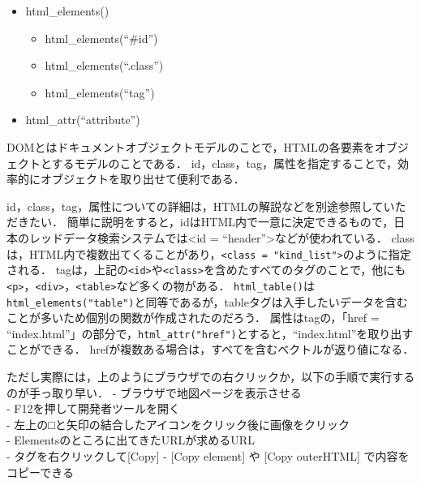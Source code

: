 \documentclass[
]{article}
\providecommand{\tightlist}{%
  \setlength{\itemsep}{0pt}\setlength{\parskip}{0pt}}
\begin{document}
\begin{itemize}
\tightlist
\item
  html\_elements()

  \begin{itemize}
  \tightlist
  \item
    html\_elements(``\#id'')\\
  \item
    html\_elements(``.class'')\\
  \item
    html\_elements(``tag'')\\
  \end{itemize}
\item
  html\_attr(``attribute'')
\end{itemize}

DOMとはドキュメントオブジェクトモデルのことで，HTMLの各要素をオブジェクトとするモデルのことである．
id，class，tag，属性を指定することで，効率的にオブジェクトを取り出せて便利である．

id，class，tag，属性についての詳細は，HTMLの解説などを別途参照していただきたい．
簡単に説明をすると，idはHTML内で一意に決定できるもので，日本のレッドデータ検索システムでは\textless id = ``header''\textgreater などが使われている．
classは，HTML内で複数出てくることがあり，\texttt{\textless{}class\ =\ "kind\_list"\textgreater{}}のように指定される．
tagは，上記の\texttt{\textless{}id\textgreater{}}や\texttt{\textless{}class\textgreater{}}を含めたすべてのタグのことで，他にも\texttt{\textless{}p\textgreater{}}，\texttt{\textless{}div\textgreater{}}，\texttt{\textless{}table\textgreater{}}など多くの物がある．
\texttt{html\_table()}は\texttt{html\_elements("table")}と同等であるが，tableタグは入手したいデータを含むことが多いため個別の関数が作成されたのだろう．
属性はtagの，「href = ``index.html''」の部分で，\texttt{html\_attr("href")}とすると，``index.html''を取り出すことができる．
hrefが複数ある場合は，すべてを含むベクトルが返り値になる．

ただし実際には，上のようにブラウザでの右クリックか，以下の手順で実行するのが手っ取り早い．
- ブラウザで地図ページを表示させる\\
- F12を押して開発者ツールを開く\\
- 左上の□と矢印の結合したアイコンをクリック後に画像をクリック\\
- Elementsのところに出てきたURLが求めるURL\\
- タグを右クリックして{[}Copy{]} - {[}Copy element{]} や {[}Copy outerHTML{]} で内容をコピーできる
\end{document}
